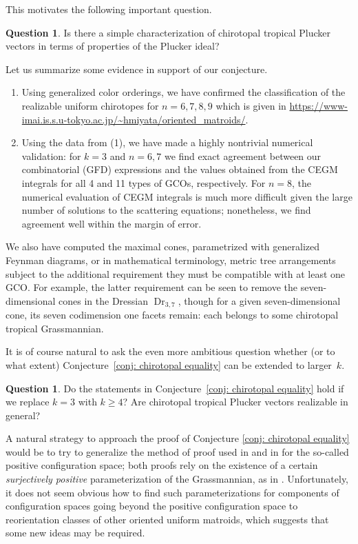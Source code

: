 \documentclass[pdftex]{sigma}
\theoremstyle{definition}
\newtheorem{question}[thm]{Question}
\numberwithin{equation}{section}
\begin{document}
This motivates the following important question.

\begin{question}
 Is there a simple characterization of chirotopal tropical Plucker vectors in terms of properties of the Plucker ideal?
\end{question}

Let us summarize some evidence in support of our conjecture.
\begin{enumerate}\itemsep=0pt
 \item[(1)] Using generalized color orderings, we have confirmed the classification of the realizable uniform chirotopes for $n=6,7,8,9$ which is given in \url{https://www-imai.is.s.u-tokyo.ac.jp/~hmiyata/oriented_matroids/}.
 \item[(2)] Using the data from (1), we have made a highly nontrivial numerical validation: for $k=3$ and $n=6,7$ we find exact agreement between our combinatorial (GFD) expressions and the values obtained from the CEGM integrals for all 4 and 11 types of GCOs, respectively. For $n=8$, the numerical evaluation of CEGM integrals is much more difficult given the large number of solutions to the scattering equations; nonetheless, we find agreement well within the margin of error.
\end{enumerate}

We also have computed the maximal cones, parametrized with generalized Feynman diagrams, or in mathematical terminology, metric tree arrangements subject to the additional requirement they must be compatible with at least one GCO. For example, the latter requirement can be seen to remove the seven-dimensional cones in the Dressian $\operatorname{Dr}_{3,7}$, though for a given seven-dimensional cone, its seven codimension one facets remain: each belongs to some chirotopal tropical Grassmannian.

It is of course natural to ask the even more ambitious question whether (or to what extent) Conjecture~\ref{conj: chirotopal equality} can be extended to larger~$k$.
\begin{question}
 Do the statements in Conjecture~\ref{conj: chirotopal equality} hold if we replace $k=3$ with $k\ge 4$? Are chirotopal tropical Plucker vectors realizable in general?
\end{question}



A natural strategy to approach the proof of Conjecture \ref{conj: chirotopal equality} would be to try to generalize the method of proof used in \cite{Arkani-Hamed:2020cig} and in \cite{speyer2021positive} for the so-called positive configuration space; both proofs rely on the existence of a certain \textit{surjectively positive} parameterization \cite{pachter2004tropical} of the Grassmannian, as in \cite{postnikov2006total}. Unfortunately, it does not seem obvious how to find such parameterizations for components of configuration spaces going beyond the positive configuration space to reorientation classes of other oriented uniform matroids, which suggests that some new ideas may be required.
\end{document}
